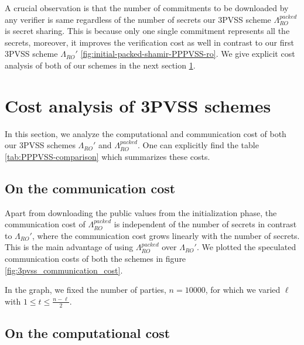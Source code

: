 \begin{remark}
  A crucial observation is that the number of commitments to be downloaded by any verifier 
  is same regardless of the number of secrets our 3PVSS scheme $\Lambda_{RO}^{packed}$ is secret sharing. 
This is because only one single commitment represents all the secrets, moreover, it 
improves the verification cost as well in contrast to our first 3PVSS scheme $\Lambda_{RO}'$ \ref{fig:initial-packed-shamir-PPPVSS-ro}. 
We give explicit cost analysis of both of our schemes in the next section \ref{sec:cost-analysis-3PVSS}.
\end{remark}



\section{Cost analysis of 3PVSS schemes}
\label{sec:cost-analysis-3PVSS}

In this section, we analyze the computational and communication cost of both our 
3PVSS schemes $\Lambda_{RO}'$ and $\Lambda_{RO}^{packed}$. One can explicitly 
find the table \ref{tab:PPPVSS-comparison} which summarizes these costs.\par



\subsection{On the communication cost}
Apart from downloading the public values from the initialization phase, the 
communication cost of $\Lambda_{RO}^{packed}$ is independent of the number of secrets in 
contrast to $\Lambda_{RO}'$, where the communication cost grows linearly with the number of secrets. 
This is the main advantage of using $\Lambda_{RO}^{packed}$ over $\Lambda_{RO}'$. We 
plotted the speculated communication costs of both the schemes in figure \ref{fig:3pvss_communication_cost}.



In the graph, we fixed the number of parties, $n=10000$, for which we varied $\ell$ with 
$1\leq t\leq \frac{n-\ell}{2}$.

\subsection{On the computational cost}

